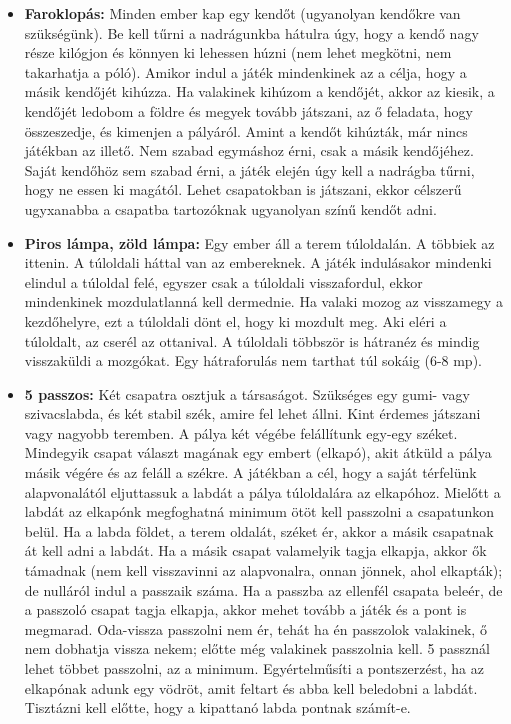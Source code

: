 \documentclass[a4paper, 12pt, twoside, openright]{article}
\begin{document}
\begin{itemize}
\item \textbf{Faroklopás:} Minden ember kap egy kendőt (ugyanolyan kendőkre van szükségünk). Be kell tűrni a nadrágunkba hátulra úgy, hogy a kendő nagy része kilógjon és könnyen ki lehessen húzni (nem lehet megkötni, nem takarhatja a póló). Amikor indul a játék mindenkinek az a célja, hogy a másik kendőjét kihúzza. Ha valakinek kihúzom a kendőjét, akkor az kiesik, a kendőjét ledobom a földre és megyek tovább játszani, az ő feladata, hogy összeszedje, és kimenjen a pályáról. Amint a kendőt kihúzták, már nincs játékban az illető. Nem szabad egymáshoz érni, csak a másik kendőjéhez. Saját kendőhöz sem szabad érni, a játék elején úgy kell a nadrágba tűrni, hogy ne essen ki magától. Lehet csapatokban is játszani, ekkor célszerű ugyxanabba a csapatba tartozóknak ugyanolyan színű kendőt adni.

\item \textbf{Piros lámpa, zöld lámpa:} Egy ember áll a terem túloldalán. A többiek az ittenin. A túloldali háttal van az embereknek. A játék indulásakor mindenki elindul a túloldal felé, egyszer csak a túloldali visszafordul, ekkor mindenkinek mozdulatlanná kell dermednie. Ha valaki mozog az visszamegy a kezdőhelyre, ezt a túloldali dönt el, hogy ki mozdult meg. Aki eléri a túloldalt, az cserél az ottanival. A túloldali többször is hátranéz és mindig visszaküldi a mozgókat. Egy hátraforulás nem tarthat túl sokáig (6-8 mp).

\item \textbf{5 passzos:} Két csapatra osztjuk a társaságot. Szükséges egy gumi- vagy szivacslabda, és két stabil szék, amire fel lehet állni. Kint érdemes játszani vagy nagyobb teremben. A pálya két végébe felállítunk egy-egy széket. Mindegyik csapat választ magának egy embert (elkapó), akit átküld a pálya másik végére és az feláll a székre. A játékban a cél, hogy a saját térfelünk alapvonalától eljuttassuk a labdát a pálya túloldalára az elkapóhoz. Mielőtt a labdát az elkapónk megfoghatná minimum ötöt kell passzolni a csapatunkon belül. Ha a labda földet, a terem oldalát, széket ér, akkor a másik csapatnak át kell adni a labdát. Ha a másik csapat valamelyik tagja elkapja, akkor ők támadnak (nem kell visszavinni az alapvonalra, onnan jönnek, ahol elkapták); de nulláról indul a passzaik száma. Ha a passzba az ellenfél csapata beleér, de a passzoló csapat tagja elkapja, akkor mehet tovább a játék és a pont is megmarad. Oda-vissza passzolni nem ér, tehát ha én passzolok valakinek, ő nem dobhatja vissza nekem; előtte még valakinek passzolnia kell. 5 passznál lehet többet passzolni, az a minimum. Egyértelműsíti a pontszerzést, ha az elkapónak adunk egy vödröt, amit feltart és abba kell beledobni a labdát. Tisztázni kell előtte, hogy a kipattanó labda pontnak számít-e.


\end{itemize}
\end{document}
